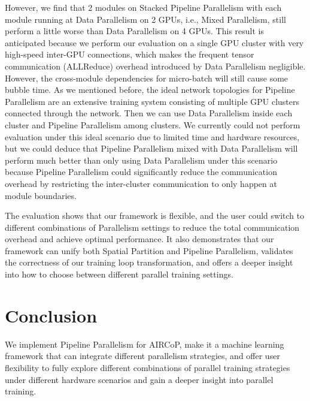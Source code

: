 \documentclass[sigplan, nonacm]{acmart}\settopmatter{printfolios=true,printccs=false,printacmref=false}
\begin{document}
However, we find that 2 modules on Stacked Pipeline Parallelism with each module running at Data Parallelism on 2 GPUs, i.e., Mixed Parallelism, still perform a little worse than Data Parallelism on 4 GPUs. This result is anticipated because we perform our evaluation on a single GPU cluster with very high-speed inter-GPU connections, which makes the frequent tensor communication (ALLReduce) overhead introduced by Data Parallelism negligible. However, the cross-module dependencies for micro-batch will still cause some bubble time. As we mentioned before, the ideal network topologies for Pipeline Parallelism are an extensive training system consisting of multiple GPU clusters connected through the network. Then we can use Data Parallelism inside each cluster and Pipeline Parallelism among clusters. We currently could not perform evaluation under this ideal scenario due to limited time and hardware resources, but we could deduce that Pipeline Parallelism mixed with Data Parallelism will perform much better than only using Data Parallelism under this scenario because Pipeline Parallelism could significantly reduce the communication overhead by restricting the inter-cluster communication to only happen at module boundaries.\par
 The evaluation shows that our framework is flexible, and the user could switch to different combinations of Parallelism settings to reduce the total communication overhead and achieve optimal performance. It also demonstrates that our framework can unify both Spatial Partition and Pipeline Parallelism, validates the correctness of our training loop transformation, and offers a deeper insight into how to choose between different parallel training settings.
 \section{Conclusion} \label{conclusion}
We implement Pipeline Parallelism for AIRCoP, make it a machine learning framework that can integrate different parallelism strategies, and offer user flexibility to fully explore different combinations of parallel training strategies under different hardware scenarios and gain a deeper insight into parallel training.


\end{document}

